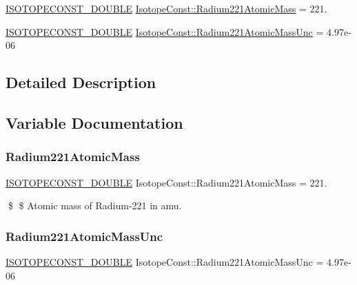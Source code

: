 \begin{DoxyCompactItemize}
\item 
\mbox{\hyperlink{group___isotope_const-_macros_ga8f45a7272ce02c0b4c65c44636ed719a}{I\+S\+O\+T\+O\+P\+E\+C\+O\+N\+S\+T\+\_\+\+D\+O\+U\+B\+LE}} \mbox{\hyperlink{group___isotope_const-_radium-_ra221_ga53850ccc68a5a8229f089630f5b5b0e7}{Isotope\+Const\+::\+Radium221\+Atomic\+Mass}} = 221.
\item 
\mbox{\hyperlink{group___isotope_const-_macros_ga8f45a7272ce02c0b4c65c44636ed719a}{I\+S\+O\+T\+O\+P\+E\+C\+O\+N\+S\+T\+\_\+\+D\+O\+U\+B\+LE}} \mbox{\hyperlink{group___isotope_const-_radium-_ra221_ga228e2815222b4356f20dcd86c371e205}{Isotope\+Const\+::\+Radium221\+Atomic\+Mass\+Unc}} = 4.\+97e-\/06
\end{DoxyCompactItemize}


\subsection{Detailed Description}


\subsection{Variable Documentation}
\mbox{\label{group___isotope_const-_radium-_ra221_ga53850ccc68a5a8229f089630f5b5b0e7}} 
\subsubsection{\texorpdfstring{Radium221\+Atomic\+Mass}{Radium221AtomicMass}}
{\footnotesize\ttfamily \mbox{\hyperlink{group___isotope_const-_macros_ga8f45a7272ce02c0b4c65c44636ed719a}{I\+S\+O\+T\+O\+P\+E\+C\+O\+N\+S\+T\+\_\+\+D\+O\+U\+B\+LE}} Isotope\+Const\+::\+Radium221\+Atomic\+Mass = 221.}

\$ \$ Atomic mass of Radium-\/221 in amu. \mbox{\label{group___isotope_const-_radium-_ra221_ga228e2815222b4356f20dcd86c371e205}} 
\subsubsection{\texorpdfstring{Radium221\+Atomic\+Mass\+Unc}{Radium221AtomicMassUnc}}
{\footnotesize\ttfamily \mbox{\hyperlink{group___isotope_const-_macros_ga8f45a7272ce02c0b4c65c44636ed719a}{I\+S\+O\+T\+O\+P\+E\+C\+O\+N\+S\+T\+\_\+\+D\+O\+U\+B\+LE}} Isotope\+Const\+::\+Radium221\+Atomic\+Mass\+Unc = 4.\+97e-\/06}

